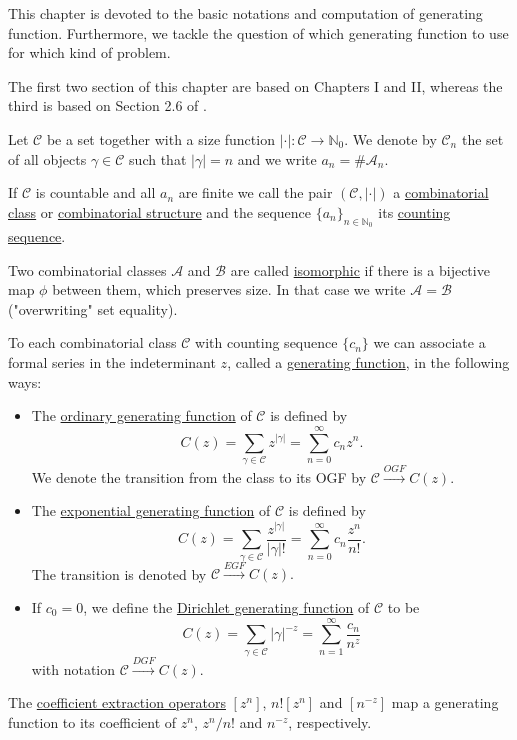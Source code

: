 This chapter is devoted to the basic notations and computation of generating function.
Furthermore, we tackle the question of which generating function to use for which kind of problem.

The first two section of this chapter are based on \cite{analyticcombinatorics} Chapters I and II, whereas the third is based on Section 2.6 of \cite{generatingfunctions}.

\begin{defn}
Let $\mathcal{C}$ be a set together with a size function $| \cdot | \colon \mathcal{C} \to \mathbb{N}_0$. 
We denote by $\mathcal{C}_n$ the set of all objects $\gamma \in \mathcal{C}$ such that $|\gamma| = n$ and we write $a_n = \#\mathcal{A}_n$.

If $\mathcal{C}$ is countable and all $a_n$ are finite we call the pair $(\mathcal{C}, | \cdot |)$ a \ul{combinatorial class} or \ul{combinatorial structure} and the sequence $\{a_n\}_{n \in \mathbb{N}_0}$ its \ul{counting sequence}.

Two combinatorial classes $\mathcal{A}$ and $\mathcal{B}$ are called \ul{isomorphic} if there is a bijective map $\phi$ between them, which preserves size.
In that case we write $\mathcal{A} = \mathcal{B}$ ("overwriting" set equality).
\end{defn}

\begin{defn}
To each combinatorial class $\mathcal{C}$ with counting sequence $\{ c_n \}$ we can associate a formal series in the indeterminant $z$, called a \underline{generating function}, in the following ways:
\begin{itemize}
    \item The \underline{ordinary generating function} of $\mathcal{C}$ is defined by
    \begin{equation*}
        C(z) = \sum_{\gamma \in \mathcal{C}} z^{|\gamma|} = \sum_{n=0}^\infty c_n z^n.
    \end{equation*}
    We denote the transition from the class to its OGF by $\mathcal{C} \xrightarrow{OGF} C(z).$
    
    \item The \underline{exponential generating function} of $\mathcal{C}$ is defined by
    \begin{equation*}
        C(z) = \sum_{\gamma \in \mathcal{C}} \frac{z^{|\gamma|}}{|\gamma|!} = \sum_{n=0}^\infty c_n \frac{z^n}{n!}.
    \end{equation*}
    The transition is denoted by $\mathcal{C} \xrightarrow{EGF} C(z).$
    
    \item If $c_0 = 0$, we define the \underline{Dirichlet generating function} of $\mathcal{C}$ to be
    \begin{equation*}
        C(z) = \sum_{\gamma \in \mathcal{C}} |\gamma|^{-z} = \sum_{n=1}^\infty \frac{c_n}{n^z}
    \end{equation*}
    with notation $\mathcal{C} \xrightarrow{DGF} C(z)$.
\end{itemize}
The \underline{coefficient extraction operators} $[z^n]$, $n![z^n]$ and $[n^{-z}]$ map a generating function to its coefficient of $z^n$, $z^n/n!$ and $n^{-z}$, respectively.
\end{defn}

